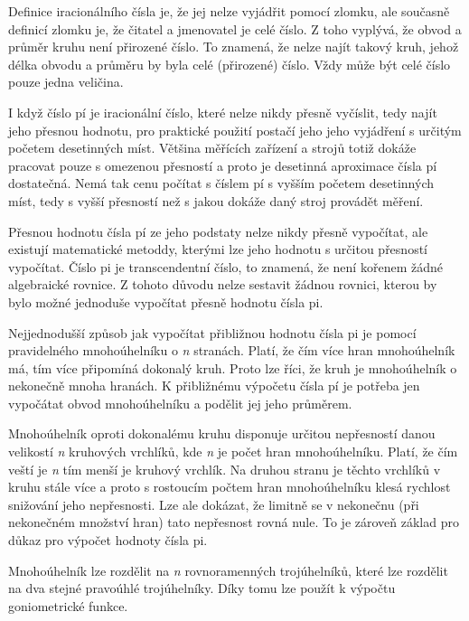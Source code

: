 Definice iracionálního čísla je, že jej nelze vyjádřit pomocí zlomku, ale současně definicí zlomku je, že čitatel a jmenovatel je celé číslo. Z toho vyplývá, že obvod a průměr kruhu není přirozené číslo. To znamená, že nelze najít takový kruh, jehož délka obvodu a průměru by byla celé (přirozené) číslo. Vždy může být celé číslo pouze jedna veličina.

I když číslo pí je iracionální číslo, které nelze nikdy přesně vyčíslit, tedy najít jeho přesnou hodnotu, pro praktické použití postačí jeho jeho vyjádření s určitým početem desetinných míst. Většina měřících zařízení a strojů totiž dokáže pracovat pouze s omezenou přesností a proto je desetinná aproximace čísla pí dostatečná. Nemá tak cenu počítat s číslem pí s vyšším početem desetinných míst, tedy s vyšší přesností než s jakou dokáže daný stroj provádět měření. 


Přesnou hodnotu čísla pí ze jeho podstaty nelze nikdy přesně vypočítat, ale existují matematické metoddy, kterými lze jeho hodnotu s určitou přesností vypočítat. Číslo pi je transcendentní číslo, to znamená, že není kořenem žádné algebraické rovnice. Z tohoto důvodu nelze sestavit žádnou rovnici, kterou by bylo možné jednoduše vypočítat přesně hodnotu čísla pi. 

Nejjednodušší způsob jak vypočítat přibližnou hodnotu čísla pi je pomocí pravidelného mnohoúhelníku o {\it n} stranách. Platí, že čím více hran mnohoúhelník má, tím více připomíná dokonalý kruh. Proto lze říci, že kruh je mnohoúhelník o nekonečně mnoha hranách. K přibližnému výpočetu čísla pí je potřeba jen vypočátat obvod mnohoúhelníku a podělit jej jeho průměrem.

\vskip 4mm
\centerline{}
\vskip 4mm

Mnohoúhelník oproti dokonalému kruhu disponuje určitou nepřesností danou velikostí {\it n} kruhových vrchlíků, kde {\it n} je počet hran mnohoúhelníku. Platí, že čím veští je {\it n} tím menší je kruhový vrchlík. Na druhou stranu je těchto vrchlíků v kruhu stále více a proto s rostoucím počtem hran mnohoúhelníku klesá rychlost snižování jeho nepřesnosti. Lze ale dokázat, že limitně se v nekonečnu (při nekonečném množství hran) tato nepřesnost rovná nule. To je zároveň základ pro důkaz pro výpočet hodnoty čísla pi.

Mnohoúhelník lze rozdělit na {\it n} rovnoramenných trojúhelníků, které lze rozdělit na dva stejné pravoúhlé trojúhelníky. Díky tomu lze použít k výpočtu goniometrické funkce.

